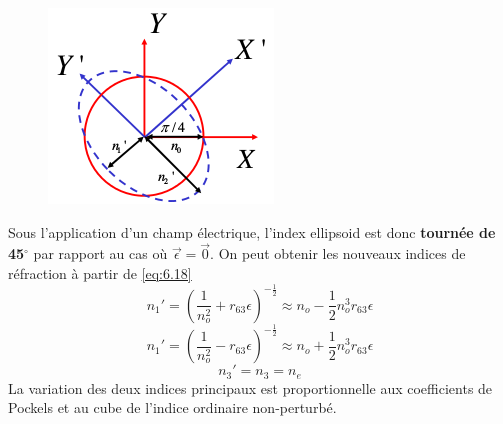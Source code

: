 	\begin{figure}
	\includegraphics[scale=0.5]{ch6/image3}
	\end{figure}
Sous l'application d'un champ électrique, l'index ellipsoid est donc \textbf{tournée de 45$^\circ$} 
par rapport au cas où $\vec{\epsilon}=\vec0$. On peut obtenir les nouveaux indices de réfraction à partir de
\eqref{eq:6.18}
\begin{equation}
n_1' = \left(\dfrac{1}{n_o^2}+r_{63}\epsilon\right)^{-\frac{1}{2}} \approx n_o-\frac{1}{2}n_o^3r_{63}\epsilon
\label{eq:6.20}
\end{equation}
\begin{equation}
n_1' = \left(\dfrac{1}{n_o^2}-r_{63}\epsilon\right)^{-\frac{1}{2}} \approx n_o+\frac{1}{2}n_o^3r_{63}\epsilon
\end{equation}
\begin{equation}
n_3'=n_3=n_e
\end{equation}
La variation des deux indices principaux est proportionnelle aux coefficients de Pockels et au cube de
l'indice ordinaire non-perturbé.



